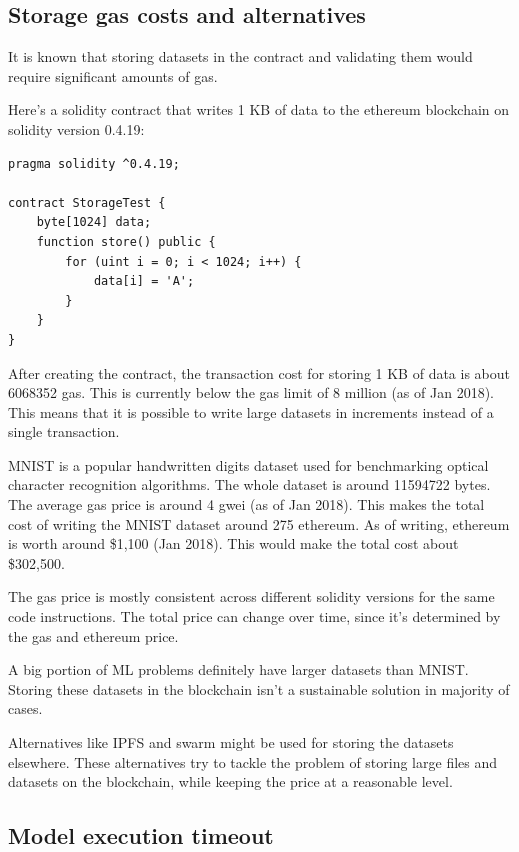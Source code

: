 \documentclass{article}
\begin{document}
\subsection{Storage gas costs and alternatives}

It is known that storing datasets in the contract and validating them would require significant amounts of gas.

Here’s a solidity contract that writes 1 KB of data to the ethereum blockchain on solidity version 0.4.19:

\begin{lstlisting}[language=Solidity]
pragma solidity ^0.4.19;

contract StorageTest {
    byte[1024] data;
    function store() public {
        for (uint i = 0; i < 1024; i++) {
            data[i] = 'A';
        }
    }
}
\end{lstlisting}

After creating the contract, the transaction cost for storing 1 KB of data is about 6068352 gas. This is currently below the gas limit of 8 million (as of Jan 2018). This means that it is possible to write large datasets in increments instead of a single transaction.

MNIST is a popular handwritten digits dataset used for benchmarking optical character recognition algorithms. The whole dataset is around 11594722 bytes. \cite{mnist_dataset_url} The average gas price is around 4 gwei (as of Jan 2018). This makes the total cost of writing the MNIST dataset around 275 ethereum. As of writing, ethereum is worth around \$1,100 (Jan 2018). This would make the total cost about \$302,500.

The gas price is mostly consistent across different solidity versions for the same code instructions. The total price can change over time, since it’s determined by the gas and ethereum price.

A big portion of ML problems definitely have larger datasets than MNIST. Storing these datasets in the blockchain isn’t a sustainable solution in majority of cases.

Alternatives like IPFS and swarm might be used for storing the datasets elsewhere. These alternatives try to tackle the problem of storing large files and datasets on the blockchain, while keeping the price at a reasonable level.

\subsection{Model execution timeout}
\end{document}

